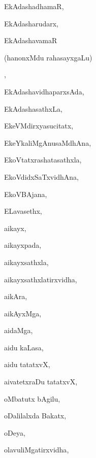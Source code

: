\begin{multicols}{3}
{\noindent
{EkAdashadhamaR}, \pageref{EkAdashadhamaR}

\noindent
{EkAdasharudarx}, \pageref{EkAdasharudarx}

\noindent
{EkAdashavamaR 

\noindent
\qquad (hanonxMdu rahasayxgaLu)}, \pageref{EkAdashavamaR (hanonxMdu rahasayxgaLu)}

\noindent
{EkAdashavidhaparxsAda}, \pageref{EkAdashavidhaparxsAda}

\noindent
{EkAdashasathxLa}, \pageref{EkAdashasathxLa}

\noindent
{EkeVMdirxyasucitatx}, \pageref{EkeVMdirxyasucitatx}

\noindent
{EkeYkaliMgAnusaMdhAna}, \pageref{EkeYkaliMgAnusaMdhAna}

\noindent
{EkoVtatxrashatasathxla}, \pageref{EkoVtatxrashatasathxla}

\noindent
{EkoVdidxSaTxvidhAna}, \pageref{EkoVdidxSaTxvidhAna}

\noindent
{EkoVBAjana}, \pageref{EkoVBAjana}

\noindent
{ELavasethx}, \pageref{ELavasethx}

\bigskip
\noindent
{}
\smallskip

\noindent
{aikayx}, \pageref{aikayx}

\noindent
{aikayxpada}, \pageref{aikayxpada}

\noindent
{aikayxsathxla}, \pageref{aikayxsathxla}

\noindent
{aikayxsathxlatirxvidha}, \pageref{aikayxsathxlatirxvidha}

\noindent
{aikAra}, \pageref{aikAra}

\noindent
{aikAyxMga}, \pageref{aikAyxMga}

\noindent
{aidaMga}, \pageref{aidaMga}

\noindent
{aidu kaLasa}, \pageref{aidu kaLasa}

\noindent
{aidu tatatxvX}, \pageref{aidu tatatxvX}

\noindent
{aivatetxraDu tatatxvX}, \pageref{aivatetxraDu tatatxvX}

\bigskip
\noindent
{}
\smallskip

\noindent
{oMbatutx bAgilu}, \pageref{oMbatutx bAgilu}

\noindent
{oDalilalxda Bakatx}, \pageref{oDalilalxda Bakatx}

\noindent
{oDeya}, \pageref{oDeya}

\noindent
{olavuliMgatirxvidha}, \pageref{olavuliMgatirxvidha}

}
\end{multicols}

